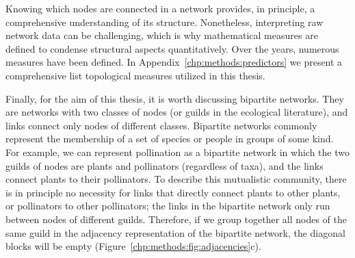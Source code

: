 
Knowing which nodes are connected in a network provides, in principle, a comprehensive understanding of its structure. Nonetheless, interpreting raw network data can be challenging, which is why mathematical measures are defined to condense structural aspects quantitatively. Over the years, numerous measures have been defined. 
In Appendix~\ref{chp:methods:predictors} we present a comprehensive list topological measures utilized in this thesis.

Finally, for the aim of this thesis, it is worth discussing bipartite networks. They are networks with two classes of nodes (or guilds in the ecological literature), and links connect only nodes of different classes. Bipartite networks commonly represent the membership of a set of species or people in groups of some kind. For example, we can represent pollination as a bipartite network in which the two guilds of nodes are plants and pollinators (regardless of taxa), and the links connect plants to their pollinators. To describe this mutualistic community, there is in principle no necessity for links that directly connect plants to other plants, or pollinators to other pollinators; the links in the bipartite network only run between nodes of different guilds. Therefore, if we group together all nodes of the same guild in the adjacency representation of the bipartite network, the diagonal blocks will be empty (Figure~\ref{chp:methods:fig:adjacencies}c).


